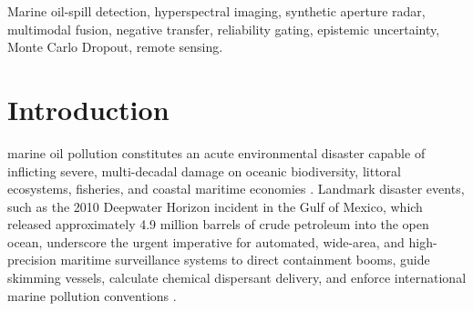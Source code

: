 \documentclass[conference]{IEEEtran}
\begin{document}
\begin{IEEEkeywords}
Marine oil-spill detection, hyperspectral imaging, synthetic aperture radar, multimodal fusion, negative transfer, reliability gating, epistemic uncertainty, Monte Carlo Dropout, remote sensing.
\end{IEEEkeywords}

\section{Introduction}
\label{sec:introduction}

 marine oil pollution constitutes an acute environmental disaster capable of inflicting severe, multi-decadal damage on oceanic biodiversity, littoral ecosystems, fisheries, and coastal maritime economies \cite{zhang2025hyperspectral}. Landmark disaster events, such as the 2010 Deepwater Horizon incident in the Gulf of Mexico, which released approximately 4.9 million barrels of crude petroleum into the open ocean, underscore the urgent imperative for automated, wide-area, and high-precision maritime surveillance systems to direct containment booms, guide skimming vessels, calculate chemical dispersant delivery, and enforce international marine pollution conventions \cite{dabbiru2015fusion,zhu2022oil}.
\end{document}
